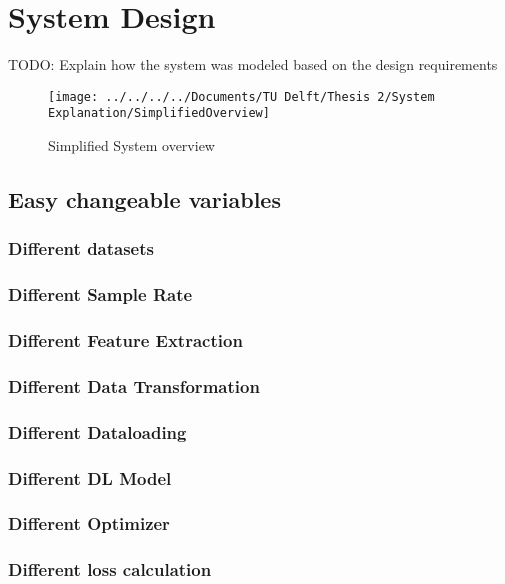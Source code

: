 \chapter{System Design}

TODO: Explain how the system was modeled based on the design requirements

\begin{figure}[h]
	\centering
	\texttt{[image: ../../../../Documents/TU Delft/Thesis 2/System Explanation/SimplifiedOverview]}
	\caption{Simplified System overview}
\end{figure}


\section{Easy changeable variables}

\subsection{Different datasets}

\subsection{Different Sample Rate}

\subsection{Different Feature Extraction}

\subsection{Different Data Transformation}

\subsection{Different Dataloading}

\subsection{Different DL Model}

\subsection{Different Optimizer}

\subsection{Different loss calculation}

